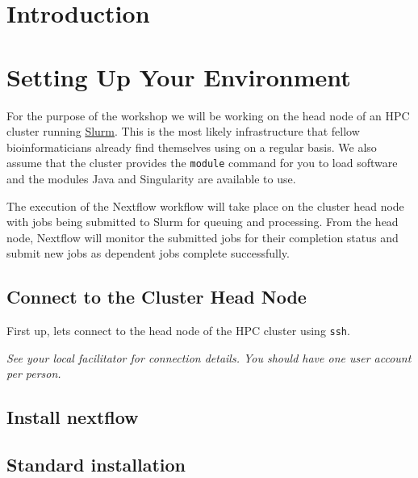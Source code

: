 \newpage

\section{Introduction}


\newpage

\section{Setting Up Your Environment}

For the purpose of the workshop we will be working on the head node of an HPC cluster running \href{https://slurm.schedmd.com/documentation.html}{Slurm}.
This is the most likely infrastructure that fellow bioinformaticians already find themselves using
on a regular basis. We also assume that the cluster provides the \texttt{module} command for you to
load software and the modules Java and Singularity are available to use.

The execution of the Nextflow workflow will take place on the cluster head node with jobs
being submitted to Slurm for queuing and processing. From the head node, Nextflow will monitor the
submitted jobs for their completion status and submit new jobs as dependent jobs complete successfully.


\subsection{Connect to the Cluster Head Node}

\begin{steps}
First up, lets connect to the head node of the HPC cluster using \texttt{ssh}.

\emph{See your local facilitator for connection details. You should have one user account per person.}

\end{steps}

\subsection{Install nextflow}

\subsection{Standard installation}

